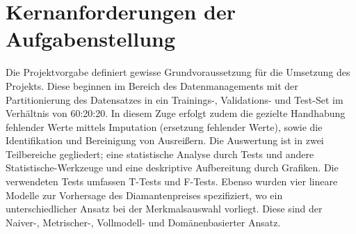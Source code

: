 \section{Kernanforderungen der Aufgabenstellung}
Die Projektvorgabe definiert gewisse Grundvoraussetzung für die Umsetzung des Projekts.
Diese beginnen im Bereich des Datenmanagements mit der Partitionierung des Datensatzes in ein Trainings-, Validations- und Test-Set im Verhältnis von 60:20:20. 
In diesem Zuge erfolgt zudem die gezielte Handhabung fehlender Werte mittels Imputation (ersetzung fehlender Werte), sowie die Identifikation und Bereinigung von Ausreißern. 
Die Auswertung ist in zwei Teilbereiche gegliedert; eine statistische Analyse durch Tests und andere Statistische-Werkzeuge und eine deskriptive Aufbereitung durch Grafiken.
Die verwendeten Tests umfassen T-Tests und F-Tests.
Ebenso wurden vier lineare Modelle zur Vorhersage des Diamantenpreises spezifiziert, wo ein unterschiedlicher Ansatz bei der Merkmalsauswahl vorliegt.
Diese sind der Naiver-, Metrischer-, Vollmodell- und Domänenbasierter Ansatz. 
